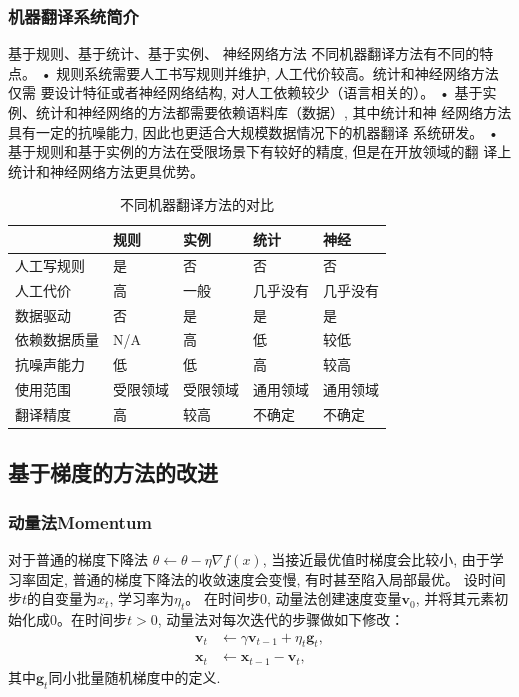 \documentclass[a4paper]{article}
\begin{document}
\subsubsection{机器翻译系统简介}
\citep{xiao2020}

基于规则、基于统计、基于实例、 神经网络方法
不同机器翻译方法有不同的特点。 
• 规则系统需要人工书写规则并维护, 人工代价较高。统计和神经网络方法仅需
要设计特征或者神经网络结构, 对人工依赖较少（语言相关的）。
• 基于实例、统计和神经网络的方法都需要依赖语料库（数据）, 其中统计和神
经网络方法具有一定的抗噪能力, 因此也更适合大规模数据情况下的机器翻译
系统研发。
• 基于规则和基于实例的方法在受限场景下有较好的精度, 但是在开放领域的翻
译上统计和神经网络方法更具优势。
\begin{table}  [!htb]
    \Large  
    \caption{不同机器翻译方法的对比}  
    \begin{center}  
    \begin{tabular}{l|lll l}  
    \hline  
    &规则&实例&统计&神经 \\ \hline
    人工写规则&是&否&否&否\\ 
    人工代价&高&一般&几乎没有&几乎没有\\ 
    数据驱动&否&是&是&是\\ 
    依赖数据质量&N/A&高&低&较低\\ 
    抗噪声能力&低&低&高&较高\\ 
    使用范围&受限领域&受限领域&通用领域&通用领域\\ 
    翻译精度&高&较高&不确定&不确定\\  
    \hline  
    \end{tabular}  
    \end{center}  
    \end{table}

\subsection{基于梯度的方法的改进}
 \subsubsection{动量法Momentum}
 对于普通的梯度下降法 $\theta \leftarrow \theta - \eta \nabla f(x)$,  当接近最优值时梯度会比较小, 由于学习率固定, 普通的梯度下降法的收敛速度会变慢, 有时甚至陷入局部最优。  
设时间步$t$的自变量为${x}_t$, 学习率为$\eta_t$。
在时间步$0$, 动量法创建速度变量$\boldsymbol{v}_0$, 并将其元素初始化成0。在时间步$t>0$, 动量法对每次迭代的步骤做如下修改：
 $$
 \begin{aligned}
 \boldsymbol{v}_t &\leftarrow \gamma \boldsymbol{v}_{t-1} + \eta_t \boldsymbol{g}_t,  \\
 \boldsymbol{x}_t &\leftarrow \boldsymbol{x}_{t-1} - \boldsymbol{v}_t, 
 \end{aligned}
 $$
 其中$\boldsymbol{g}_t$同小批量随机梯度中的定义.
\end{document}
